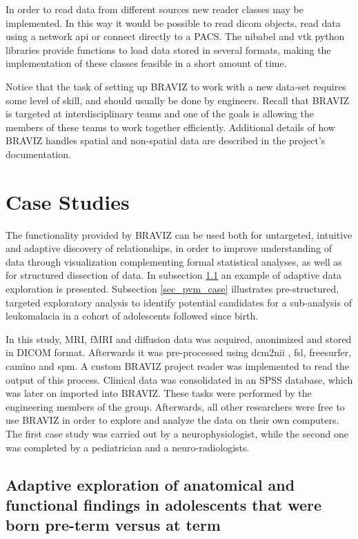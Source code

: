 \documentclass[twocolumn]{svjour3}
\begin{document}
In order to read data from different sources new reader classes may be implemented. In this way it would be possible to read dicom objects, read data using a network api or connect directly to a PACS. The nibabel and vtk python libraries provide functions to load data stored in several formats, making the implementation of these classes feasible in a short amount of time.

Notice that the task of setting up BRAVIZ to work with a new data-set requires some level of skill, and should usually be done by engineers. Recall that BRAVIZ is targeted at interdisciplinary teams and one of the goals is allowing the members of these teams to work together efficiently. Additional details of how BRAVIZ handles spatial and non-spatial data are described in the project's documentation. 

\section{Case Studies}

The functionality provided by BRAVIZ can be used both for untargeted, intuitive and adaptive discovery of relationships, in order to improve understanding of data through visualization complementing formal statistical analyses, as well as for structured dissection of data. In subsection \ref{sec_case_cyril} an example of adaptive data exploration is presented. Subsection \ref{sec_pvm_case} illustrates pre-structured, targeted exploratory analysis to identify potential candidates for a sub-analysis of leukomalacia in a cohort of adolescents followed since birth. 

In this study, MRI, fMRI and diffusion data was acquired, anonimized and stored in DICOM format. Afterwards it was pre-processed using dcm2nii \cite{rorden_mricron_2007}, fsl\cite{jenkinson_fsl_2012}, freesurfer\cite{fischl_freesurfer_2012}, camino\cite{cook_camino:_2006} and spm\cite{friston_statistical_2007}. A custom BRAVIZ project reader was implemented to read the output of this process. 
Clinical data was consolidated in an SPSS database, which was later on imported into BRAVIZ. These tasks were performed by the engineering members of the group. Afterwards, all other researchers were free to use BRAVIZ in order to explore and analyze the data on their own computers. The first case study was carried out by a neurophysiologist, while the second one was completed by a  pediatrician and a neuro-radiologists. 

 
\subsection{Adaptive exploration of anatomical and functional findings in adolescents that were born pre-term versus at term}
\label{sec_case_cyril}
\end{document}
